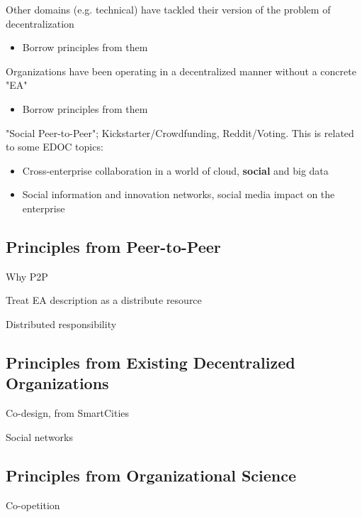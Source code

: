 Other domains (e.g. technical) have tackled their version of the problem of decentralization
    \begin{itemize}
    \item Borrow principles from them
    \end{itemize}
    
    Organizations have been operating in a decentralized manner without a concrete "EA"
    \begin{itemize}
    \item Borrow principles from them
    \end{itemize}
    
    "Social Peer-to-Peer"; Kickstarter/Crowdfunding, Reddit/Voting. This is related to some EDOC topics:
    \begin{itemize}
    \item Cross-enterprise collaboration in a world of cloud, \textbf{social} and big data
    \item Social information and innovation networks, social media impact on the enterprise
    \end{itemize}

\subsection{Principles from Peer-to-Peer}

Why P2P

Treat EA description as a distribute resource

Distributed responsibility 

\subsection{Principles from Existing Decentralized Organizations}

Co-design, from SmartCities

Social networks

\subsection{Principles from Organizational Science}

Co-opetition
